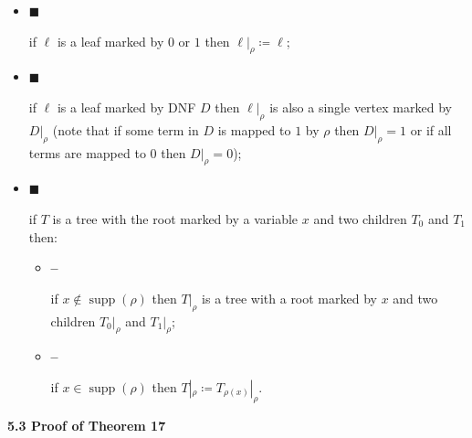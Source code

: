 \begin{itemize}


\item[] 
$\blacksquare$ 


if $\ell$ is a leaf marked by $0$ or $1$ then $\ell|_{\rho}\coloneqq\ell$;\par





\item[] 
$\blacksquare$ 


if $\ell$ is a leaf marked by DNF $D$ then $\ell|_{\rho}$ is also a single vertex marked by
$D|_{\rho}$ (note that if some term in $D$ is mapped to $1$ by $\rho$ then $D|_{\rho}=1$ or if all
terms are mapped to $0$ then $D|_{\rho}=0$);\par





\item[] 
$\blacksquare$ 


if $T$ is a tree with the root marked by a variable $x$ and two children $T_{0}$ and $T_{1}$ then:\par


\begin{itemize}


\item[] 
\textbf{–} 


if $x\notin\operatorname*{supp}(\rho)$ then $T|_{\rho}$ is a tree with a root marked by $x$ and two
children $T_{0}|_{\rho}$ and $T_{1}|_{\rho}$;\par





\item[] 
\textbf{–} 


if $x\in\operatorname*{supp}(\rho)$ then $T|_{\rho}\coloneqq T_{\rho(x)}|_{\rho}$.\par





\end{itemize}





\end{itemize}





\par\medskip\noindent\textbf{
5.3 Proof of Theorem 17
}\par




